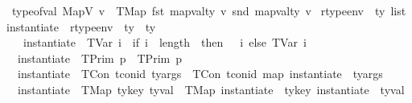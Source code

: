 \begin{isabellebody}
\ {\isacharbar}{\kern0pt}\ {\isachardoublequoteopen}type{\isacharunderscore}{\kern0pt}of{\isacharunderscore}{\kern0pt}val\ {\isacharparenleft}{\kern0pt}MapV\ v{\isacharparenright}{\kern0pt}\ {\isacharequal}{\kern0pt}\ TMap\ {\isacharparenleft}{\kern0pt}fst\ {\isacharparenleft}{\kern0pt}mapval{\isacharunderscore}{\kern0pt}ty\ v{\isacharparenright}{\kern0pt}{\isacharparenright}{\kern0pt}\ {\isacharparenleft}{\kern0pt}snd\ {\isacharparenleft}{\kern0pt}mapval{\isacharunderscore}{\kern0pt}ty\ v{\isacharparenright}{\kern0pt}{\isacharparenright}{\kern0pt}{\isachardoublequoteclose}\isanewline
\isanewline
{}\isamarkupfalse%
\ rtype{\isacharunderscore}{\kern0pt}env\ {\isacharequal}{\kern0pt}\ {\isachardoublequoteopen}ty\ list{\isachardoublequoteclose}\isanewline
\isanewline
\isanewline
{}\isamarkupfalse%
\ instantiate\ {\isacharcolon}{\kern0pt}{\isacharcolon}{\kern0pt}\ {\isachardoublequoteopen}rtype{\isacharunderscore}{\kern0pt}env\ {\isasymRightarrow}\ ty\ {\isasymRightarrow}\ ty{\isachardoublequoteclose}\isanewline
\ \ \isanewline
\ \ \ \ {\isachardoublequoteopen}instantiate\ {\isasymOmega}\ {\isacharparenleft}{\kern0pt}TVar\ i{\isacharparenright}{\kern0pt}\ {\isacharequal}{\kern0pt}\ {\isacharparenleft}{\kern0pt}if\ i\ {\isacharless}{\kern0pt}\ length\ {\isasymOmega}\ then\ {\isasymOmega}\ {\isacharbang}{\kern0pt}\ i\ else\ TVar\ i{\isacharparenright}{\kern0pt}{\isachardoublequoteclose}\isanewline
\ \ {\isacharbar}{\kern0pt}\ {\isachardoublequoteopen}instantiate\ {\isasymOmega}\ {\isacharparenleft}{\kern0pt}TPrim\ p{\isacharparenright}{\kern0pt}\ {\isacharequal}{\kern0pt}\ {\isacharparenleft}{\kern0pt}TPrim\ p{\isacharparenright}{\kern0pt}{\isachardoublequoteclose}\isanewline
\ \ {\isacharbar}{\kern0pt}\ {\isachardoublequoteopen}instantiate\ {\isasymOmega}\ {\isacharparenleft}{\kern0pt}TCon\ tcon{\isacharunderscore}{\kern0pt}id\ ty{\isacharunderscore}{\kern0pt}args{\isacharparenright}{\kern0pt}\ {\isacharequal}{\kern0pt}\ {\isacharparenleft}{\kern0pt}TCon\ tcon{\isacharunderscore}{\kern0pt}id\ {\isacharparenleft}{\kern0pt}map\ {\isacharparenleft}{\kern0pt}instantiate\ {\isasymOmega}{\isacharparenright}{\kern0pt}\ ty{\isacharunderscore}{\kern0pt}args{\isacharparenright}{\kern0pt}{\isacharparenright}{\kern0pt}{\isachardoublequoteclose}\isanewline
\ \ {\isacharbar}{\kern0pt}\ {\isachardoublequoteopen}instantiate\ {\isasymOmega}\ {\isacharparenleft}{\kern0pt}TMap\ ty{\isacharunderscore}{\kern0pt}key\ ty{\isacharunderscore}{\kern0pt}val{\isacharparenright}{\kern0pt}\ {\isacharequal}{\kern0pt}\ {\isacharparenleft}{\kern0pt}TMap\ {\isacharparenleft}{\kern0pt}instantiate\ {\isasymOmega}\ ty{\isacharunderscore}{\kern0pt}key{\isacharparenright}{\kern0pt}\ {\isacharparenleft}{\kern0pt}instantiate\ {\isasymOmega}\ ty{\isacharunderscore}{\kern0pt}val{\isacharparenright}{\kern0pt}{\isacharparenright}{\kern0pt}{\isachardoublequoteclose}\isanewline

\end{isabellebody}
